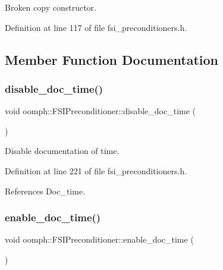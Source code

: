 Broken copy constructor. 



Definition at line 117 of file fsi\+\_\+preconditioners.\+h.



\subsection{Member Function Documentation}
\mbox{\label{classoomph_1_1FSIPreconditioner_a932cb1cf6a20503a5cbb43a6b67f2340}} 
\subsubsection{\texorpdfstring{disable\+\_\+doc\+\_\+time()}{disable\_doc\_time()}}
{\footnotesize\ttfamily void oomph\+::\+F\+S\+I\+Preconditioner\+::disable\+\_\+doc\+\_\+time (\begin{DoxyParamCaption}{ }\end{DoxyParamCaption})\hspace{0.3cm}{\ttfamily [inline]}}



Disable documentation of time. 



Definition at line 221 of file fsi\+\_\+preconditioners.\+h.



References Doc\+\_\+time.

\mbox{\label{classoomph_1_1FSIPreconditioner_a2836b05d6eb81b807bd53b50dad7d3a0}} 
\subsubsection{\texorpdfstring{enable\+\_\+doc\+\_\+time()}{enable\_doc\_time()}}
{\footnotesize\ttfamily void oomph\+::\+F\+S\+I\+Preconditioner\+::enable\+\_\+doc\+\_\+time (\begin{DoxyParamCaption}{ }\end{DoxyParamCaption})\hspace{0.3cm}{\ttfamily [inline]}}




